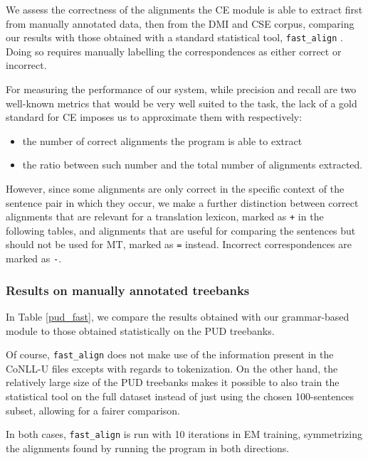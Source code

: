 \documentclass[11pt]{article}
\begin{document}
We assess the correctness of the alignments the CE module is able to extract first from manually annotated data, then from the DMI and CSE corpus, comparing our results with those obtained with a standard statistical tool, \texttt{fast\_align} \cite{TODO:}.
Doing so requires manually labelling the correspondences as either correct or incorrect. 

For measuring the performance of our system, while precision and recall are two well-known metrics that would be very well suited to the task, the lack of a gold standard for CE imposes us to approximate them with respectively:

\begin{itemize}
  \item the number of correct alignments the program is able to extract
  \item the ratio between such number and the total number of alignments extracted.
 \end{itemize}

However, since some alignments are only correct in the specific context of the sentence pair in which they occur, we make a further distinction between correct alignments that are relevant for a translation lexicon, marked as \texttt{+} in the following tables, and alignments that are useful for comparing the sentences but should not be used for MT, marked as \texttt{=} instead. %
Incorrect correspondences are marked as \texttt{-}. 

\subsubsection{Results on manually annotated treebanks} 
In Table \ref{pud_fast}, we compare the results obtained with our grammar-based module to those obtained statistically on the PUD treebanks. 

Of course, \texttt{fast\_align} does not make use of the information present in the CoNLL-U files excepts with regards to tokenization. 
On the other hand, the relatively large size of the PUD treebanks makes it possible to also train the statistical tool on the full dataset instead of just using the chosen 100-sentences subset, allowing for a fairer comparison. 

In both cases, \texttt{fast\_align} is run with 10 iterations in EM training, symmetrizing the alignments found by running the program in both directions.
\end{document}
